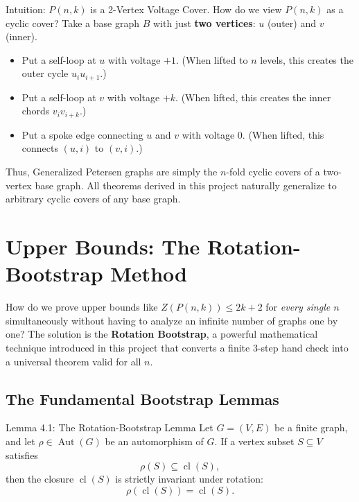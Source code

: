 \documentclass[11pt]{article}
\begin{document}
\begin{intubox}{Intuition: $P(n,k)$ is a 2-Vertex Voltage Cover.}
How do we view $P(n,k)$ as a cyclic cover?
Take a base graph $B$ with just \textbf{two vertices}: $u$ (outer) and $v$ (inner).
\begin{itemize}[leftmargin=*,nosep]
  \item Put a self-loop at $u$ with voltage $+1$. (When lifted to $n$ levels, this creates the outer cycle $u_i u_{i+1}$.)
  \item Put a self-loop at $v$ with voltage $+k$. (When lifted, this creates the inner chords $v_i v_{i+k}$.)
  \item Put a spoke edge connecting $u$ and $v$ with voltage $0$. (When lifted, this connects $(u, i)$ to $(v, i)$.)
\end{itemize}
Thus, Generalized Petersen graphs are simply the $n$-fold cyclic covers of a two-vertex base graph. All theorems derived in this project naturally generalize to arbitrary cyclic covers of any base graph.
\end{intubox}

\newpage

\section{Upper Bounds: The Rotation-Bootstrap Method}

How do we prove upper bounds like $Z(P(n,k)) \le 2k+2$ for \emph{every single $n$} simultaneously without having to analyze an infinite number of graphs one by one?
The solution is the \textbf{Rotation Bootstrap}, a powerful mathematical technique introduced in this project that converts a finite 3-step hand check into a universal theorem valid for all $n$.

\subsection{The Fundamental Bootstrap Lemmas}

\begin{thmbox}{Lemma 4.1: The Rotation-Bootstrap Lemma}
Let $G = (V, E)$ be a finite graph, and let $\rho \in \operatorname{Aut}(G)$ be an automorphism of $G$. 
If a vertex subset $S \subseteq V$ satisfies
\begin{equation}
  \rho(S) \subseteq \operatorname{cl}(S),
\end{equation}
then the closure $\operatorname{cl}(S)$ is strictly invariant under rotation:
\begin{equation}
  \rho(\operatorname{cl}(S)) = \operatorname{cl}(S).
\end{equation}
\end{thmbox}
\end{document}
